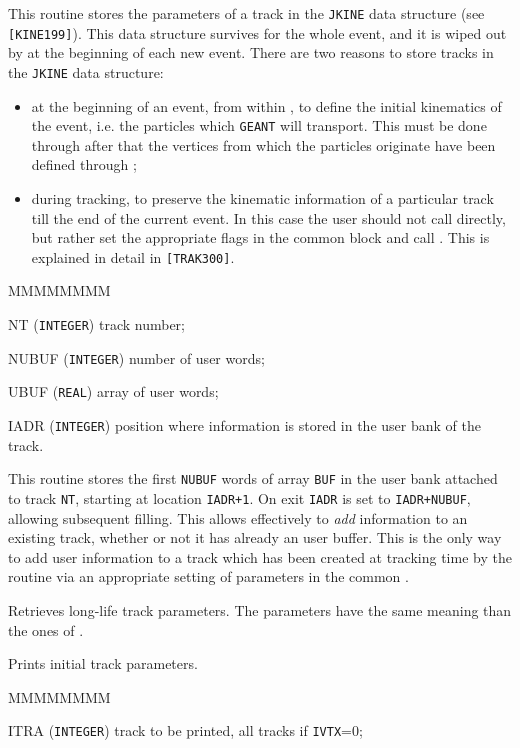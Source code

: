 This routine stores the parameters of a track in the {\tt JKINE}
data structure (see {\tt [KINE199]}). This data structure survives for
the whole event, and it is wiped out by  at the beginning 
of each new event.  There are two reasons to store tracks
in the {\tt JKINE} data structure:
\begin{itemize}
\item at the beginning of an event, from within , to define
the initial kinematics of the event, i.e. the particles which {\tt GEANT}
will transport. This must be done through 
after that the vertices from which the particles originate have been defined
through ;
\item during tracking, to preserve the kinematic information of a 
particular track till the end of the current event. In this case the user should
not call  directly, but rather set the appropriate flags in the
 common block and call . This is explained in 
detail in {\tt [TRAK300]}.
\end{itemize}

\begin{DLtt}{MMMMMMMM}
\item[NT] ({\tt INTEGER}) track number;
\item[NUBUF] ({\tt INTEGER}) number of user words;
\item[UBUF] ({\tt REAL}) array of user words;
\item[IADR] ({\tt INTEGER}) position where information is stored in the
user bank of the track.
\end{DLtt}

This routine stores the first {\tt NUBUF} words of array {\tt BUF} in the
user bank attached to track {\tt NT}, starting at location {\tt IADR+1}.
On exit {\tt IADR} is set to {\tt IADR+NUBUF}, allowing subsequent filling. 
This allows effectively 
to {\it add} information to an existing track, whether or not it has already
an user buffer. This is the only way to add user information to a track
which has been created at tracking time by the routine  via
an appropriate setting of parameters in the common .

Retrieves long-life track parameters. The parameters have the same meaning
than the ones of .

Prints initial track parameters.
\begin{DLtt}{MMMMMMMM}
\item[ITRA] ({\tt INTEGER}) track to be printed, all tracks if {\tt IVTX}=0;
\end{DLtt}
